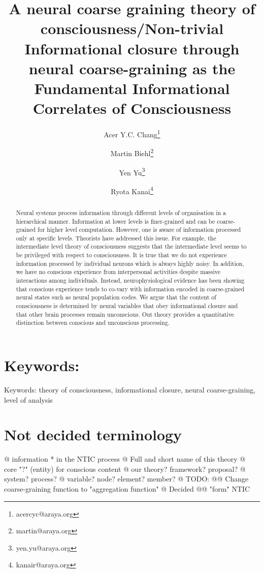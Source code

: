 \documentclass[utf8]{article}
\title{A neural coarse graining theory of consciousness/\newline Non-trivial Informational closure through neural coarse-graining as the Fundamental Informational Correlates of Consciousness }
\author[]{Acer Y.C. Chang\thanks{acercyc@araya.org}}
\author[]{Martin Biehl\thanks{martin@araya.org}}
\author[]{Yen Yu\thanks{yen.yu@araya.org}}
\author[]{Ryota Kanai\thanks{kanair@araya.org }}
\affil[]{ARAYA, Inc., Tokyo, Japan}
\begin{document}
	\maketitle
	\tableofcontents


	\begin{abstract}
		Neural systems process information through different levels of organisation in a hierarchical manner. Information at lower levels is finer-grained and can be coarse-grained for higher level computation. However, one is aware of information processed only at specific levels. Theorists have addressed this issue. For example, the intermediate level theory of consciousness suggests that the intermediate level seems to be privileged with respect to consciousness. It is true that we do not experience information processed by individual neurons which is always highly noisy. In addition, we have no conscious experience from interpersonal activities despite massive interactions among individuals. Instead, neurophysiological evidence has been showing that conscious experience tends to co-vary with information encoded in coarse-grained neural states such as neural population codes. We argue that the content of consciousness is determined by neural variables that obey informational closure and that other brain processes remain unconscious. Out theory provides a quantitative distinction between conscious and unconscious processing. 
	\end{abstract}


	\section*{Keywords:}
	Keywords: theory of consciousness, informational closure, neural coarse-graining, level of analysis

    \newpage
    \section*{Not decided terminology}
        \begin{ants}
            @ information * in the NTIC process
            @ Full and short name of this theory
            @ core "?" (entity) for conscious content 
            @ our theory? framework? proposal? 
            @ system? process?
            @ variable? node? element? member?
            @ TODO:
                @@ Change coarse-graining function to "aggregation function"
            @ Decided
                @@ "form" NTIC
        \end{ants}
    
\end{document}
